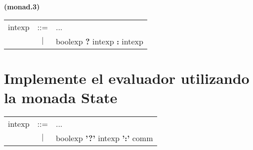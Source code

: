 \documentclass[a4paper,10pt]{article}
\begin{document}
\textbf{(monad.3)}

\begin{tabular} {l c l}
intexp  & ::=     & ... \\
        & $\vert$ & boolexp \textbf{?} intexp \textbf{:} intexp
\end{tabular}


\section*{Implemente el evaluador utilizando la monada State}
\begin{tabular} {l c l}
intexp  & ::=     & ... \\
        & $\vert$ & boolexp \textbf{'?'} intexp \textbf{':'} comm
\end{tabular}
\end{document}

